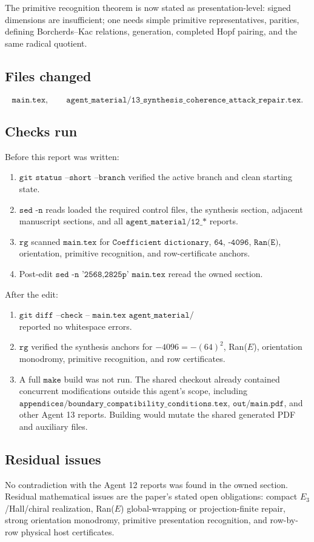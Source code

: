 The primitive recognition theorem is now stated as presentation-level:
signed dimensions are insufficient; one needs simple primitive
representatives, parities, defining Borcherds--Kac relations,
generation, completed Hopf pairing, and the same radical quotient.

\subsection{Files changed}

\[
\texttt{main.tex},\qquad
\texttt{agent\_material/13\_synthesis\_coherence\_attack\_repair.tex}.
\]

\subsection{Checks run}

Before this report was written:
\begin{enumerate}
\item \(\texttt{git status --short --branch}\) verified the active
branch and clean starting state.
\item \(\texttt{sed -n}\) reads loaded the required control files,
the synthesis section, adjacent manuscript sections, and all
\(\texttt{agent\_material/12\_*}\) reports.
\item \(\texttt{rg}\) scanned \(\texttt{main.tex}\) for
\(\texttt{Coefficient dictionary}\), \(\texttt{64}\),
\(\texttt{-4096}\), \(\texttt{Ran(E)}\), orientation, primitive
recognition, and row-certificate anchors.
\item Post-edit \(\texttt{sed -n '2568,2825p' main.tex}\) reread the
owned section.
\end{enumerate}

After the edit:
\begin{enumerate}
\item \(\texttt{git diff --check -- main.tex agent\_material/13\_synthesis\_coherence\_attack\_repair.tex}\)
reported no whitespace errors.
\item \(\texttt{rg}\) verified the synthesis anchors for
\(-4096=-(64)^2\), Ran(\(E\)), orientation monodromy, primitive
recognition, and row certificates.
\item A full \(\texttt{make}\) build was not run.  The shared checkout
already contained concurrent modifications outside this agent's scope,
including \(\texttt{appendices/boundary\_compatibility\_conditions.tex}\),
\(\texttt{out/main.pdf}\), and other Agent 13 reports.  Building would
mutate the shared generated PDF and auxiliary files.
\end{enumerate}

\subsection{Residual issues}

No contradiction with the Agent 12 reports was found in the owned
section.  Residual mathematical issues are the paper's stated open
obligations: compact \(E_3\)/Hall/chiral realization, Ran(\(E\))
global-wrapping or projection-finite repair, strong orientation
monodromy, primitive presentation recognition, and row-by-row physical
host certificates.
